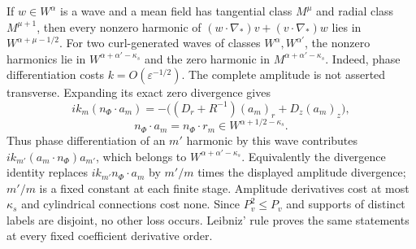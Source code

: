 \documentclass[10pt,a4paper]{article}
\newcounter{none}
\begin{document}
If $w\in W^\alpha$ is a wave and a mean field has tangential class
$M^\mu$ and radial class $M^{\mu+1}$, then every nonzero harmonic of
$(w\!\cdot\!\nabla_*)v+(v\!\cdot\!\nabla_*)w$ lies in
$W^{\alpha+\mu-1/2}$.  For two curl-generated waves of classes
$W^\alpha,W^{\alpha'}$, the nonzero harmonics lie in
$W^{\alpha+\alpha'-\kappa_s}$ and the zero harmonic in
$M^{\alpha+\alpha'-\kappa_s}$.  Indeed, phase differentiation costs
$k=O(\varepsilon^{-1/2})$. The complete amplitude is not asserted
transverse. Expanding its exact zero divergence gives
\[
ik_m(n_\Phi\cdot a_m)
=-\big((D_r+R^{-1})(a_m)_r+D_z(a_m)_z\big),
\]
\[
n_\Phi\cdot a_m=n_\Phi\cdot r_m\in
W^{\alpha+1/2-\kappa_s}.
\]
Thus phase differentiation of an $m'$ harmonic by this wave contributes
$ik_{m'}(a_m\cdot n_\Phi)a_{m'}$, which belongs to
$W^{\alpha+\alpha'-\kappa_s}$. Equivalently the divergence identity
replaces $ik_{m'}n_\Phi\cdot a_m$ by $m'/m$ times the displayed amplitude
divergence; $m'/m$ is a fixed constant at each finite stage. Amplitude
derivatives cost at most $\kappa_s$ and cylindrical connections cost none.
Since $P_v^2\le P_v$ and supports of distinct labels
are disjoint, no other loss occurs.  Leibniz' rule proves the same statements
at every fixed coefficient derivative order.
\end{document}
